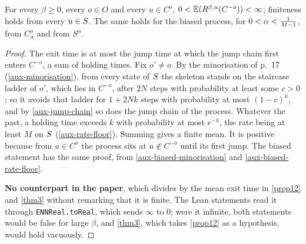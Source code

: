 \begin{lemma}
  \label{aux-exit-time-finite}
  \leanok
  For every $\beta \ge 0$, every $o \in O$ and every $u \in C^o$,
  $0 < \mathbb{E}(R^{\beta,u}(C^{-o})) < \infty$; finiteness holds from every
  $u \in S$.  The same holds for the biased process, for
  $0 < \alpha < \tfrac{1}{M-1}$, from $C_\alpha^o$ and from $S^\alpha$.
\end{lemma}
\begin{proof}
  \leanok
  The exit time is at most the jump time at which the jump chain first enters
  $C^{-o}$, a sum of holding times.  Fix $o' \ne o$.  By the minorisation of
  p.~17 (\ref{aux-minorisation}), from every state of $S$ the skeleton
  stands on the staircase ladder of $o'$, which lies in $C^{-o}$, after $2N$
  steps with probability at least some $c > 0$; so it avoids that ladder for
  $1 + 2Nk$ steps with probability at most $(1 - c)^k$, and by
  \ref{aux-jump-chain} so does the jump chain of the process.  Whatever the
  past, a holding time exceeds $k$ with probability at most $e^{-k}$, the rate
  being at least $M$ on $S$ (\ref{aux-rate-floor}).  Summing gives a
  finite mean.  It is positive because from $u \in C^o$ the process sits at
  $u \notin C^{-o}$ until its first jump.  The biased statement has the same
  proof, from \ref{aux-biased-minorisation} and \ref{aux-biased-rate-floor}.

  \textbf{No counterpart in the paper}, which divides by the mean exit time
  in \ref{prop12} and \ref{thm3} without remarking that it is finite.  The
  Lean statements read it through \texttt{ENNReal.toReal}, which sends
  $\infty$ to $0$; were it infinite, both statements would be false for large
  $\beta$, and \ref{thm3}, which takes \ref{prop12} as a hypothesis, would
  hold vacuously.
\end{proof}

